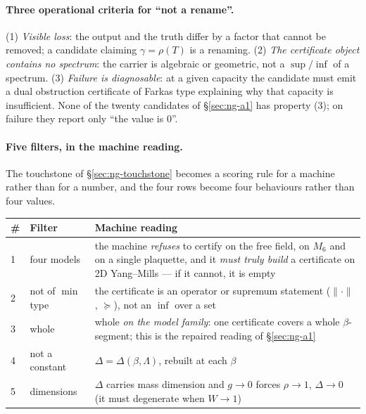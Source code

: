 \paragraph{Three operational criteria for ``not a rename''.}
(1) \emph{Visible loss}: the output and the truth differ by a factor that cannot be removed; a
candidate claiming $\gamma=\rho(T)$ is a renaming. (2) \emph{The certificate object contains no
spectrum}: the carrier is algebraic or geometric, not a $\sup/\inf$ of a spectrum. (3) \emph{Failure is
diagnosable}: at a given capacity the candidate must emit a dual obstruction certificate of Farkas
type explaining why that capacity is insufficient. None of the twenty candidates of
\S\ref{sec:ng-a1} has property (3); on failure they report only ``the value is $0$''.

\paragraph{Five filters, in the machine reading.}
The touchstone of \S\ref{sec:ng-touchstone} becomes a scoring rule for a machine rather than for a
number, and the four rows become four behaviours rather than four values.

\footnotesize
\begin{center}
\begin{tabular}{@{}p{0.6cm}>{\raggedright\arraybackslash}p{5.5cm}>{\raggedright\arraybackslash}p{7.4cm}@{}}
\toprule
\# & Filter & Machine reading\\
\midrule
1 & four models & the machine \emph{refuses} to certify on the free field, on $M_6$ and on a single plaquette, and it \emph{must truly build} a certificate on 2D Yang--Mills --- if it cannot, it is empty\\
2 & not of $\min$ type & the certificate is an operator or supremum statement ($\|\cdot\|$, $\succeq$), not an $\inf$ over a set\\
3 & whole & whole \emph{on the model family}: one certificate covers a whole $\beta$-segment; this is the repaired reading of \S\ref{sec:ng-a1}\\
4 & not a constant & $\Delta=\Delta(\beta,\Lambda)$, rebuilt at each $\beta$\\
5 & dimensions & $\Delta$ carries mass dimension and $g\to0$ forces $\rho\to1$, $\Delta\to0$ (it must degenerate when $W\to1$)\\
\bottomrule
\end{tabular}
\label{tab:ng-filters}
\end{center}
\normalsize

